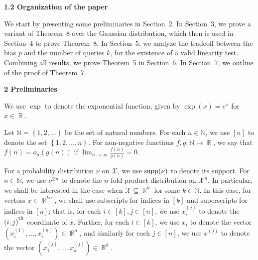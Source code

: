 \documentclass[10pt,a4paper]{article}
\begin{document}
\par\medskip\noindent\textbf{
1.2 Organization of the paper}\par




We start by presenting some preliminaries in Section 2.
In Section 3, we prove a variant of Theorem 8 over the Gaussian distribution, which then is used in Section 4 to prove Theorem 8.
In Section 5, we analyze the tradeoff between the bias $p$ and the number of queries $k$, for the existence of a valid linearity test.
Combining all results, we prove Theorem 5 in Section 6.
In Section 7, we outline of the proof of Theorem 7.\par






\par\medskip\noindent\textbf{
2 Preliminaries}\par




We use $\exp$ to denote the exponential function, given by $\exp(x)=e^{x}$ for $x\in\mathop{\mathbb{R}}$.\par




Let $\mathbb{N}=\left\{1,2,\dots\right\}$ be the set of natural numbers. For each $n\in\mathbb{N}$, we use $[n]$ to denote the set $\left\{1,2,\dots,n\right\}$.
For non-negative functions $f,g:\mathbb{N}\to\mathop{\mathbb{R}}$, we say that $f(n)=o_{n}(g(n))$ if $\lim_{n\to\infty}\frac{f(n)}{g(n)}=0$.\par




For a probability distribution $\nu$ on $\mathcal{X}$, we use $\textnormal{supp}(\nu)$ to denote its support.
For $n\in\mathbb{N}$, we use $\nu^{\otimes n}$ to denote the $n$-fold product distribution on $\mathcal{X}^{n}$.
In particular, we shall be interested in the case when $\mathcal{X}\subseteq\mathop{\mathbb{R}}^{k}$ for some $k\in\mathbb{N}$.
In this case, for vectors $x\in\mathop{\mathbb{R}}^{kn}$, we shall use subscripts for indices in $[k]$ and superscripts for indices in $[n]$; that is, for each $i\in[k],j\in[n]$, we use $x_{i}^{\left(j\right)}$ to denote the $(i,j)^{\textsuperscript{th}}$ coordinate of $x$.
Further, for each $i\in[k]$, we use $x_{i}$ to denote the vector $\left(x_{i}^{\left(1\right)},\dots,x_{i}^{\left(n\right)}\right)\in\mathop{\mathbb{R}}^{n}$, and similarly for each $j\in[n]$, we use $x^{\left(j\right)}$ to denote the vector $\left(x_{1}^{\left(j\right)},\dots,x_{k}^{\left(j\right)}\right)\in\mathop{\mathbb{R}}^{k}$.\par
\end{document}
